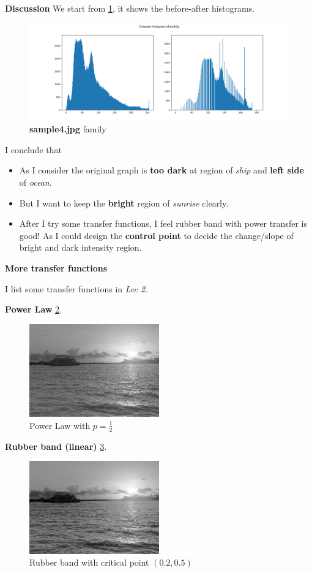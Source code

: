 \textbf{Discussion}
We start from \cref{fig2g_hist}, it shows the before-after histograms.
\begin{figure}
\centering
\includegraphics[width=\textwidth]{image/prob2g.png}
\caption{\textbf{sample4.jpg} family}
\label{fig2g_hist}
\end{figure}
I conclude that
\begin{itemize}
\tightlist
\item As I consider the original graph is \textbf{too dark} at region of \textit{ship} and \textbf{left side} of \textit{ocean}.
\item But I want to keep the \textbf{bright} region of \textit{sunrise} clearly.
\item After I try some transfer functions, I feel rubber band with power transfer is good! As I could design the \textbf{control point} to decide the change/slope of bright and dark intensity region.
\end{itemize}

\textbf{More transfer functions}

I list some transfer functions in \textit{Lec 2}.

\textbf{Power Law} \cref{fig2g_t1}.
\begin{figure}
  \centering
  \includegraphics[width=0.5\textwidth]{image/tmp/7_result_1.jpg}
  \caption{Power Law with $p=\frac{1}{2}$}
  \label{fig2g_t1}
\end{figure}

\textbf{Rubber band (linear)} \cref{fig2g_t2}.
\begin{figure}
  \centering
  \includegraphics[width=0.5\textwidth]{image/tmp/7_result_2.jpg}
  \caption{Rubber band with critical point $(0.2, 0.5)$}
  \label{fig2g_t2}
\end{figure}

